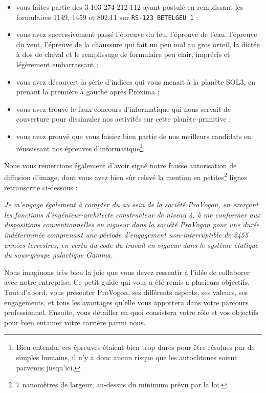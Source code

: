 \begin{itemize}
    \item vous faites partie des 3 103 274 212 112 ayant postulé en remplissant
        les formulaires 1149, 1459 et 802.11 sur \texttt{RS-123 BETELGEU~1} ;
    \item vous avez successivement passé l'épreuve du feu, l'épreuve de l'eau,
        l'épreuve du vent, l'épreuve de la chaussure qui fait un peu mal au
        gros orteil, la dictée à dos de cheval et le remplissage de formulaire
        peu clair, imprécis et légèrement embarrassant ;
    \item vous avez découvert la série d'indices qui vous menait à la planète
        SOL3, en prenant la première à gauche après Proxima ;
    \item vous avez trouvé le faux concours d'informatique qui nous servait de
        couverture pour dissimuler nos activités sur cette planète primitive ;
    \item vous avez prouvé que vous faisiez bien partie de nos meilleurs
        candidats en réussissant nos épreuves d'informatique\footnote{Bien
        entendu, ces épreuves étaient bien trop dures pour être résolues par de
        simples humains, il n'y a donc aucun risque que les autochtones soient
        parvenus jusqu'ici.}.
\end{itemize}

Nous vous remercions également d'avoir signé notre fausse autorisation de
diffusion d'image, dont vous avez bien sûr relevé la mention en
petites\footnote{7 nanomètres de largeur, au-dessus du minimum prévu par la
loi.} lignes retranscrite ci-dessous :

\emph{Je m'engage également à compter du au sein de la société ProVogon, en
exerçant les fonctions d'ingénieur-architecte constructeur de niveau 4, à me
conformer aux dispositions conventionnelles en vigueur dans la société ProVogon
pour une durée indéterminée comprenant une période d'engagement
non-interruptible de 2455 années terrestres, en vertu du code du travail en
vigueur dans le système étatique du sous-groupe galactique Gamma.}

Nous imaginons très bien la joie que vous devez ressentir à l'idée de
collaborer avec notre entreprise. Ce petit guide qui vous a été remis a
plusieurs objectifs. Tout d'abord, vous présenter ProVogon, ses différents
aspects, ses valeurs, ses engagements, et tous les avantages qu'elle vous
apportera dans votre parcours professionnel. Ensuite, vous détailler en quoi
consistera votre rôle et vos objectifs pour bien entamer votre carrière parmi
nous.

